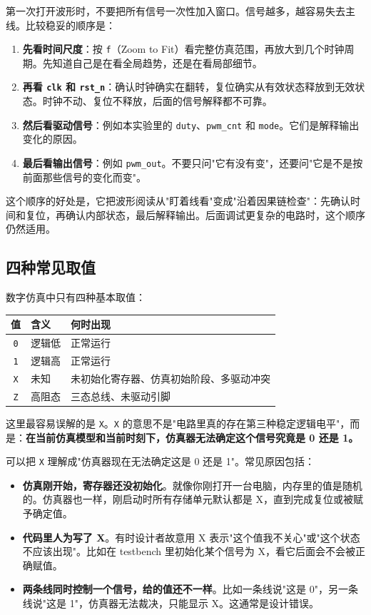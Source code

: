 \documentclass[11pt,a4paper]{article}
\begin{document}
第一次打开波形时，不要把所有信号一次性加入窗口。信号越多，越容易失去主线。比较稳妥的顺序是：

\begin{enumerate}
  \item \textbf{先看时间尺度}：按 \texttt{f}（Zoom to Fit）看完整仿真范围，再放大到几个时钟周期。先知道自己是在看全局趋势，还是在看局部细节。
  \item \textbf{再看 \texttt{clk} 和 \texttt{rst\_n}}：确认时钟确实在翻转，复位确实从有效状态释放到无效状态。时钟不动、复位不释放，后面的信号解释都不可靠。
  \item \textbf{然后看驱动信号}：例如本实验里的 \texttt{duty}、\texttt{pwm\_cnt} 和 \texttt{mode}。它们是解释输出变化的原因。
  \item \textbf{最后看输出信号}：例如 \texttt{pwm\_out}。不要只问"它有没有变"，还要问"它是不是按前面那些信号的变化而变"。
\end{enumerate}

这个顺序的好处是，它把波形阅读从"盯着线看"变成"沿着因果链检查"：先确认时间和复位，再确认内部状态，最后解释输出。后面调试更复杂的电路时，这个顺序仍然适用。

\subsection{四种常见取值}

数字仿真中只有四种基本取值：

\begin{center}
\begin{tabular}{clp{8cm}}
\toprule
\textbf{值} & \textbf{含义} & \textbf{何时出现} \\
\midrule
\texttt{0} & 逻辑低 & 正常运行 \\
\texttt{1} & 逻辑高 & 正常运行 \\
\texttt{X} & 未知 & 未初始化寄存器、仿真初始阶段、多驱动冲突 \\
\texttt{Z} & 高阻态 & 三态总线、未驱动引脚 \\
\bottomrule
\end{tabular}
\end{center}

这里最容易误解的是 \texttt{X}。\texttt{X} 的意思不是"电路里真的存在第三种稳定逻辑电平"，而是：\textbf{在当前仿真模型和当前时刻下，仿真器无法确定这个信号究竟是 0 还是 1。}

可以把 \texttt{X} 理解成"仿真器现在无法确定这是 0 还是 1"。常见原因包括：

\begin{itemize}
  \item \textbf{仿真刚开始，寄存器还没初始化}。就像你刚打开一台电脑，内存里的值是随机的。仿真器也一样，刚启动时所有存储单元默认都是 X，直到完成复位或被赋予确定值。
  \item \textbf{代码里人为写了 X}。有时设计者故意用 X 表示"这个值我不关心"或"这个状态不应该出现"。比如在 testbench 里初始化某个信号为 X，看它后面会不会被正确赋值。
  \item \textbf{两条线同时控制一个信号，给的值还不一样}。比如一条线说"这是 0"，另一条线说"这是 1"，仿真器无法裁决，只能显示 X。这通常是设计错误。
\end{itemize}
\end{document}
